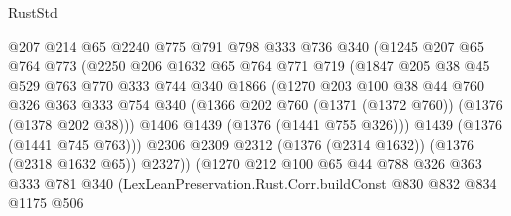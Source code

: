 \begin{lexlean}{RustStd}
\begin{coremodule}
{\begin{coremodule}
{{{{{                        @207
                        @214
                        @65
                        @2240
                        @775
                        @791
                        @798
                        @333
                        @736
                        @340
                        (@1245
                          @207
                          @65
                          @764
                          @773
                          (@2250
                            @206
                            @1632
                            @65
                            @764
                            @771
                            @719
                            (@1847
                              @205
                              @38
                              @45
                              @529
                              @763
                              @770
                              @333
                              @744
                              @340
                              @1866
                              (@1270
                                @203
                                @100
                                @38
                                @44
                                @760
                                @326
                                @363
                                @333
                                @754
                                @340
                                (@1366 @202 @760 (@1371 (@1372 @760)) (@1376 (@1378 @202 @38)))
                                @1406
                                @1439
                                (@1376 (@1441 @755 @326)))
                              @1439
                              (@1376 (@1441 @745 @763)))
                            @2306
                            @2309
                            @2312
                            (@1376 (@2314 @1632))
                            (@1376 (@2318 @1632 @65))
                            @2327))
                        (@1270
                          @212
                          @100
                          @65
                          @44
                          @788
                          @326
                          @363
                          @333
                          @781
                          @340
                          (LexLeanPreservation.Rust.Corr.buildConst
                            @830
                            @832
                            @834
                            @1175
                            @506
}}}}}
\end{coremodule}}
\end{coremodule}
\end{lexlean}

